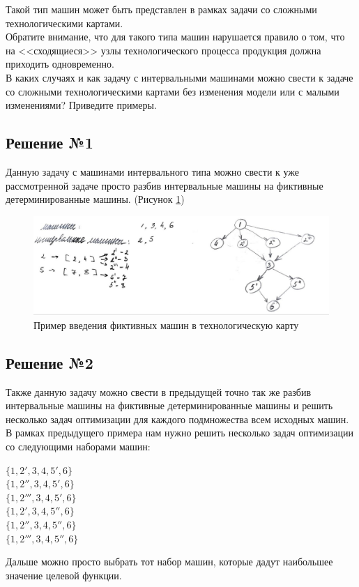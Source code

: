 \documentclass[14pt,fleqn]{extarticle}
\begin{document}
	Такой тип машин может быть представлен в рамках задачи со сложными технологическими картами.\\
	
	Обратите внимание, что для такого типа машин нарушается правило о том, что на <<сходящиеся>> узлы технологического процесса продукция должна приходить одновременно.\\
	
	В каких случаях и как задачу с интервальными машинами можно свести к задаче со сложными технологическими картами без изменения модели или с малыми изменениями? Приведите примеры.\\
	
	\newpage
	
	\subsection*{Решение №1}
	
	Данную задачу с машинами интервального типа можно свести к уже рассмотренной задаче просто разбив интервальные машины на фиктивные детерминированные машины. (Рисунок \ref{fig:graph})
	\begin{figure}[h]
		\centering \includegraphics[scale=0.35]{graph}
		\caption{Пример введения фиктивных машин в технологическую карту}
		\label{fig:graph}
	\end{figure}

	\subsection*{Решение №2}
	Также данную задачу можно свести в предыдущей точно так же разбив интервальные машины на фиктивные детерминированные машины и решить несколько задач оптимизации для каждого подмножества всем исходных машин.\\
	
	В рамках предыдущего примера нам нужно решить несколько задач оптимизации со следующими наборами машин:

	\begin{center}
		$\{1, 2', 3, 4, 5', 6\}$\\
		$\{1, 2'', 3, 4, 5', 6\}$\\
		$\{1, 2''', 3, 4, 5', 6\}$\\
		$\{1, 2', 3, 4, 5'', 6\}$\\
		$\{1, 2'', 3, 4, 5'', 6\}$\\
		$\{1, 2''', 3, 4, 5'', 6\}$\\
	\end{center}

	Дальше можно просто выбрать тот набор машин, которые дадут наибольшее значение целевой функции.
\end{document}
